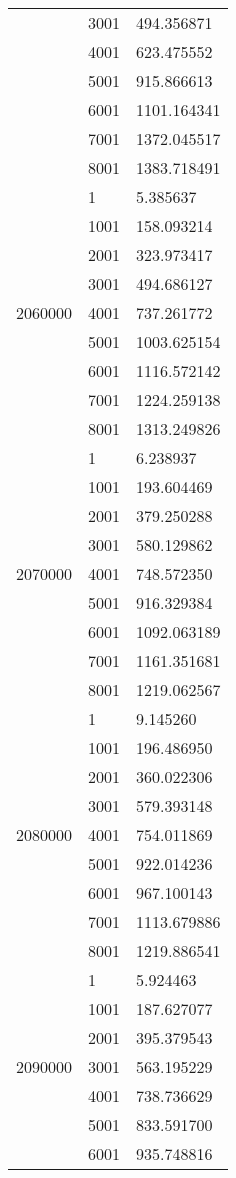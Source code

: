 \begin{table}[htb!]
\begin{tabular}{lll}
 & 3001 & 494.356871 \\
 & 4001 & 623.475552 \\
 & 5001 & 915.866613 \\
 & 6001 & 1101.164341 \\
 & 7001 & 1372.045517 \\
 & 8001 & 1383.718491 \\
\multirow[c]{9}{*}{2060000} & 1 & 5.385637 \\
 & 1001 & 158.093214 \\
 & 2001 & 323.973417 \\
 & 3001 & 494.686127 \\
 & 4001 & 737.261772 \\
 & 5001 & 1003.625154 \\
 & 6001 & 1116.572142 \\
 & 7001 & 1224.259138 \\
 & 8001 & 1313.249826 \\
\multirow[c]{9}{*}{2070000} & 1 & 6.238937 \\
 & 1001 & 193.604469 \\
 & 2001 & 379.250288 \\
 & 3001 & 580.129862 \\
 & 4001 & 748.572350 \\
 & 5001 & 916.329384 \\
 & 6001 & 1092.063189 \\
 & 7001 & 1161.351681 \\
 & 8001 & 1219.062567 \\
\multirow[c]{9}{*}{2080000} & 1 & 9.145260 \\
 & 1001 & 196.486950 \\
 & 2001 & 360.022306 \\
 & 3001 & 579.393148 \\
 & 4001 & 754.011869 \\
 & 5001 & 922.014236 \\
 & 6001 & 967.100143 \\
 & 7001 & 1113.679886 \\
 & 8001 & 1219.886541 \\
\multirow[c]{9}{*}{2090000} & 1 & 5.924463 \\
 & 1001 & 187.627077 \\
 & 2001 & 395.379543 \\
 & 3001 & 563.195229 \\
 & 4001 & 738.736629 \\
 & 5001 & 833.591700 \\
 & 6001 & 935.748816 \\

\end{tabular}
\end{table}
